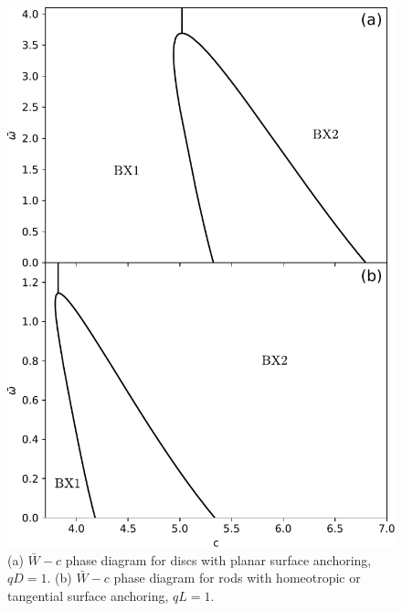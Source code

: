    \begin{figure}
	\includegraphics[width = .9\columnwidth]{figures/chapter-4/diagrams}
	\caption{(a) $\bar{W} - c $ phase diagram for discs with planar surface anchoring, $qD = 1$. (b) $\bar{W} - c $ phase diagram for rods with homeotropic or tangential surface anchoring, $qL = 1$.}
	\label{phdiag}
\end{figure}



